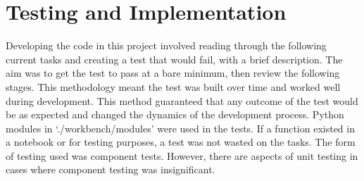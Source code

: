\documentclass[12pt]{report} %
\begin{document}
	\section{Testing and Implementation}
		Developing the code in this project involved reading through the following current tasks and creating a test that would fail, with a brief description. The aim was to get the test to pass at a bare minimum, then review the following stages. This methodology meant the test was built over time and worked well during development. This method guaranteed that any outcome of the test would be as expected and changed the dynamics of the development process. Python modules in `./workbench/modules' were used in the tests. If a function existed in a notebook or for testing purposes, a test was not wasted on the tasks. The form of testing used was component tests. However, there are aspects of unit testing in cases where component testing was insignificant.
\end{document}

